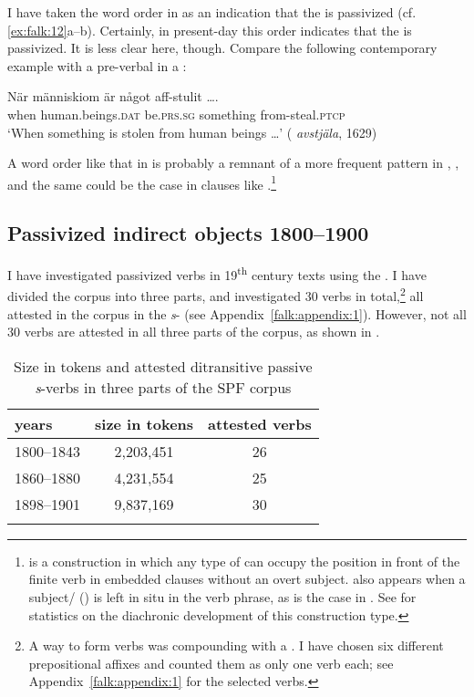 \documentclass[output=paper]{langscibook}
\begin{document}
I have taken the word order in  as an indication that the  is passivized (cf. \ref{ex:falk:12}a–b). Certainly, in present-day  this order indicates that the  is passivized. It is less clear here, though. Compare the following contemporary example with a pre-verbal   in a :\largerpage

\ea%
    \label{ex:falk:18}
\gll När  människiom      är        något      aff-stulit …. \\
    when  human.beings\textsc{.dat}  be.\textsc{prs.sg}  something  from-steal.\textsc{ptcp}\\
\glt ‘When something is stolen from human beings …’ ( \textit{avstjäla}, 1629)
\z


A word order like that in  is probably a remnant of a more frequent pattern in , , and the same could be the case in clauses like .\footnote{ is a construction in which any type of  can occupy the position in front of the finite verb in embedded clauses without an overt subject.  also appears when a subject/ () is left in situ in the verb phrase, as is the case in . See \citet[326]{Falk1993} for statistics on the diachronic development of this construction type.}

\subsection{Passivized indirect objects 1800–1900}\label{sec:falk:3.5}


I have investigated passivized  verbs in 19\textsuperscript{th} century texts using the . I have divided the corpus into three parts, and investigated 30  verbs in total,\footnote{A  way to form  verbs was compounding with a . I have chosen six different prepositional affixes and counted them as only one verb each; see Appendix~\ref{falk:appendix:1} for the selected verbs.\label{fn:02:15}} all attested in the corpus in the \textit{s}{}- (see Appendix~\ref{falk:appendix:1}). However, not all 30 verbs are attested in all three parts of the corpus, as shown in .

\begin{table}
\caption{Size in tokens and attested ditransitive passive \textit{s}{}-verbs in three parts of the SPF corpus\label{tab:falk:1}}
\begin{tabular}{lcc}
\lsptoprule
years & size in tokens & attested verbs\\\midrule
1800–1843 & 2,203,451 & 26\\
1860–1880 & 4,231,554 & 25\\
1898–1901 & 9,837,169 & 30\\
\lspbottomrule
\end{tabular}
\end{table}
\end{document}
